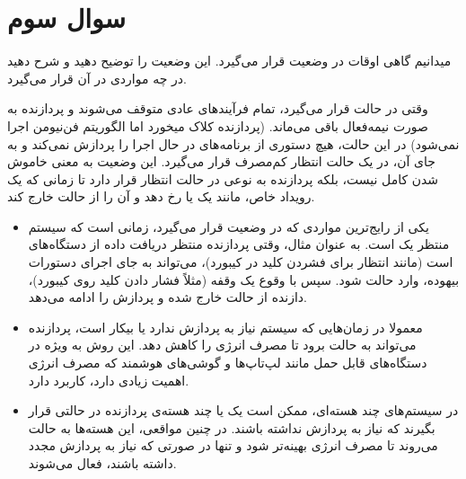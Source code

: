 \section{سوال سوم}

میدانیم گاهی اوقات  در وضعیت  قرار می‌گیرد. این وضعیت را توضیح دهید و شرح دهید در چه مواردی  در آن قرار می‌گیرد.


\begin{qsolve}[]
	وقتی  در حالت  قرار می‌گیرد، تمام فرآیندهای عادی متوقف می‌شوند و پردازنده به صورت نیمه‌فعال باقی می‌ماند. (پردازنده کلاک میخورد اما الگوریتم فن‌نیومن اجرا نمی‌شود) در این حالت،  هیچ دستوری از برنامه‌های در حال اجرا را پردازش نمی‌کند و به جای آن، در یک حالت انتظار کم‌مصرف قرار می‌گیرد. این وضعیت به معنی خاموش شدن کامل  نیست، بلکه پردازنده به نوعی در حالت انتظار قرار دارد تا زمانی که یک رویداد خاص، مانند یک  یا  رخ دهد و آن را از حالت  خارج کند.
	
	\begin{itemize}
		\item 
		 یکی از رایج‌ترین مواردی که  در وضعیت  قرار می‌گیرد، زمانی است که سیستم منتظر یک  است. به عنوان مثال، وقتی پردازنده منتظر دریافت داده از دستگاه‌های  است (مانند انتظار برای فشردن کلید در کیبورد)، می‌تواند به جای اجرای دستورات بیهوده، وارد حالت  شود. سپس با وقوع یک وقفه (مثلاً فشار دادن کلید روی کیبورد)، دازنده از حالت  خارج شده و پردازش را ادامه می‌دهد.
		 
		 \item 
		معمولا در زمان‌هایی که سیستم نیاز به پردازش ندارد یا بیکار است، پردازنده می‌تواند به حالت  برود تا مصرف انرژی را کاهش دهد. این روش به ویژه در دستگاه‌های قابل حمل مانند لپ‌تاپ‌ها و گوشی‌های هوشمند که مصرف انرژی اهمیت زیادی دارد، کاربرد دارد.
		
		\item 
		 در سیستم‌های چند هسته‌ای، ممکن است یک یا چند هسته‌ی پردازنده در حالتی قرار بگیرند که نیاز به پردازش نداشته باشند. در چنین مواقعی، این هسته‌ها به حالت  می‌روند تا مصرف انرژی بهینه‌تر شود و تنها در صورتی که نیاز به پردازش مجدد داشته باشند، فعال می‌شوند.
	\end{itemize}
\end{qsolve}